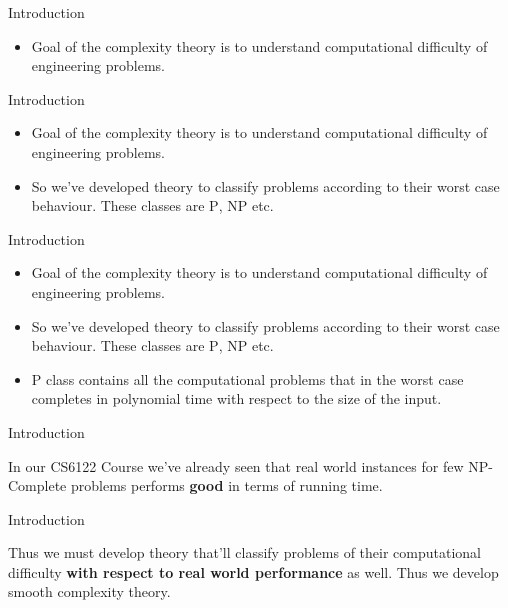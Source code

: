 \begin{frame}{Introduction}
    \begin{itemize}
        \item Goal of the complexity theory is to understand computational difficulty of engineering problems.
    \end{itemize}
\end{frame}

\begin{frame}{Introduction}
    \begin{itemize}
        \item Goal of the complexity theory is to understand computational difficulty of engineering problems.
        \item So we've developed theory to classify problems according to their worst case behaviour. These classes are \textsc{P}, \textsc{NP} etc.
    \end{itemize}
\end{frame}

\begin{frame}{Introduction}
    \begin{itemize}
        \item Goal of the complexity theory is to understand computational difficulty of engineering problems.
        \item So we've developed theory to classify problems according to their worst case behaviour. These classes are \textsc{P}, \textsc{NP} etc.
        \item \textsc{P} class contains all the computational problems that in the worst case completes in polynomial time with respect to the size of the input.
    \end{itemize}
\end{frame}

\begin{frame}{Introduction}
    \begin{center}
        In our \textsc{CS6122} Course we've already seen that real world instances for few NP-Complete problems performs \textbf{good} in terms of running time.
    \end{center}
\end{frame}

\begin{frame}{Introduction}
    \begin{center}
        Thus we must develop theory that'll classify problems of their computational difficulty \textbf{with respect to real world performance} as well. Thus we develop smooth complexity theory.
    \end{center}
\end{frame}

